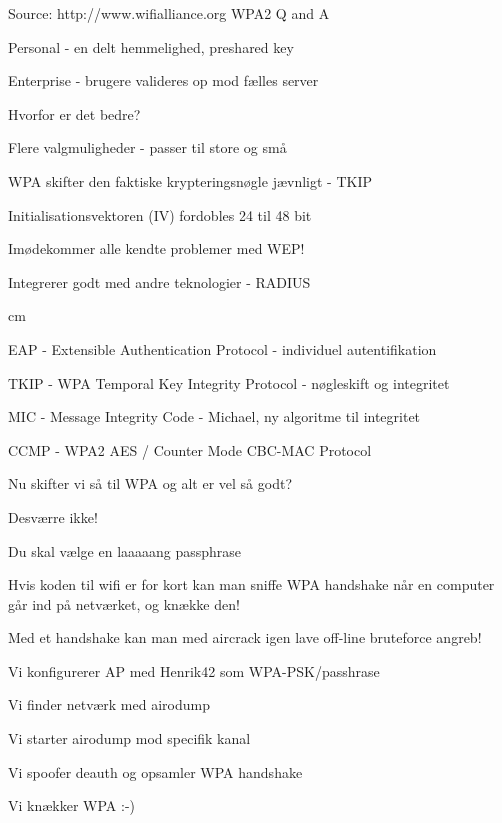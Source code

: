 \documentclass[Screen16to9,17pt]{foils}
\begin{document}
\centerline{Source: http://www.wifialliance.org WPA2 Q and A}


\begin{list1}
\item Personal - en delt hemmelighed, preshared key
\item Enterprise - brugere valideres op mod fælles server
\item Hvorfor er det bedre?
\begin{list2}
\item Flere valgmuligheder - passer til store og små
\item WPA skifter den faktiske krypteringsnøgle jævnligt - TKIP
\item Initialisationsvektoren (IV) fordobles 24 til 48 bit
\item Imødekommer alle kendte problemer med WEP!
\item Integrerer godt med andre teknologier - RADIUS

 cm
\item EAP - Extensible Authentication Protocol - individuel autentifikation
\item TKIP - WPA Temporal Key Integrity Protocol - nøgleskift og integritet
\item MIC - Message Integrity Code - Michael, ny algoritme til integritet
\item CCMP - WPA2 AES / Counter Mode CBC-MAC Protocol
\end{list2}

\end{list1}



\begin{list1}
\item Nu skifter vi så til WPA og alt er vel så godt?
\pause
\item Desværre ikke!
\item Du skal vælge en laaaaang passphrase
\item Hvis koden til wifi er for kort kan man sniffe WPA
  handshake når en computer går ind på netværket, og knække den!
\item Med et handshake kan man med aircrack igen lave off-line
  bruteforce angreb!
\end{list1}


\begin{list1}
\item Vi konfigurerer AP med Henrik42 som WPA-PSK/passhrase
\item Vi finder netværk med airodump
\item Vi starter airodump mod specifik kanal
\item Vi spoofer deauth og opsamler WPA handshake
\item Vi knækker WPA :-)
\end{list1}
\end{document}
